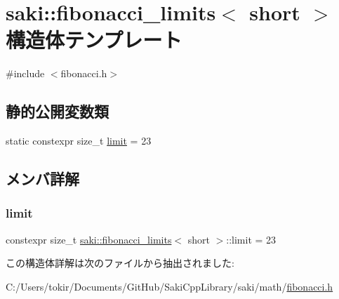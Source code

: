 \hypertarget{structsaki_1_1fibonacci__limits_3_01short_01_4}{}\section{saki\+:\+:fibonacci\+\_\+limits$<$ short $>$ 構造体テンプレート}
\label{structsaki_1_1fibonacci__limits_3_01short_01_4}


{\ttfamily \#include $<$fibonacci.\+h$>$}

\subsection*{静的公開変数類}
\begin{DoxyCompactItemize}
\item 
static constexpr size\+\_\+t \mbox{\hyperlink{structsaki_1_1fibonacci__limits_3_01short_01_4_a610895ef7ef15c8fb9e7c5e431a5dd23}{limit}} = 23
\end{DoxyCompactItemize}


\subsection{メンバ詳解}
\mbox{\label{structsaki_1_1fibonacci__limits_3_01short_01_4_a610895ef7ef15c8fb9e7c5e431a5dd23}} 
\subsubsection{\texorpdfstring{limit}{limit}}
{\footnotesize\ttfamily constexpr size\+\_\+t \mbox{\hyperlink{structsaki_1_1fibonacci__limits}{saki\+::fibonacci\+\_\+limits}}$<$ short $>$\+::limit = 23\hspace{0.3cm}{\ttfamily [static]}}



この構造体詳解は次のファイルから抽出されました\+:\begin{DoxyCompactItemize}
\item 
C\+:/\+Users/tokir/\+Documents/\+Git\+Hub/\+Saki\+Cpp\+Library/saki/math/\mbox{\hyperlink{fibonacci_8h}{fibonacci.\+h}}\end{DoxyCompactItemize}
